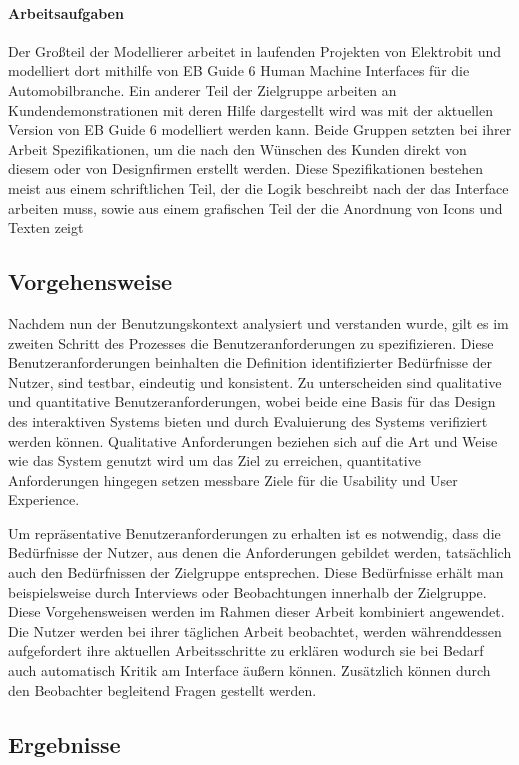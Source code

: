 \paragraph{Arbeitsaufgaben}
Der Großteil der Modellierer arbeitet in laufenden Projekten von Elektrobit und modelliert dort mithilfe von EB Guide 6 Human Machine Interfaces für die Automobilbranche.
Ein anderer Teil der Zielgruppe arbeiten an Kundendemonstrationen mit deren Hilfe dargestellt wird was mit der aktuellen Version von EB Guide 6 modelliert werden kann.
Beide Gruppen setzten bei ihrer Arbeit Spezifikationen, um die nach den Wünschen des Kunden direkt von diesem oder von Designfirmen erstellt werden.
Diese Spezifikationen bestehen meist aus einem schriftlichen Teil, der die Logik beschreibt nach der das Interface arbeiten muss, sowie aus einem grafischen Teil der die Anordnung von Icons und Texten zeigt

\subsection{Vorgehensweise}
Nachdem nun der Benutzungskontext analysiert und verstanden wurde, gilt es im zweiten Schritt des Prozesses die Benutzeranforderungen zu spezifizieren.
Diese Benutzeranforderungen beinhalten die Definition identifizierter Bedürfnisse der Nutzer, sind testbar, eindeutig und konsistent.
Zu unterscheiden sind qualitative und quantitative Benutzeranforderungen, wobei beide eine Basis für das Design des interaktiven Systems bieten und durch Evaluierung des Systems verifiziert werden können.
Qualitative Anforderungen beziehen sich auf die Art und Weise wie das System genutzt wird um das Ziel zu erreichen, quantitative Anforderungen hingegen setzen messbare Ziele für die Usability und User Experience.\cite{.f}

Um repräsentative Benutzeranforderungen zu erhalten ist es notwendig, dass die Bedürfnisse der Nutzer, aus denen die Anforderungen gebildet werden, tatsächlich auch den Bedürfnissen der Zielgruppe entsprechen.
Diese Bedürfnisse erhält man beispielsweise durch Interviews oder Beobachtungen innerhalb der Zielgruppe.
Diese Vorgehensweisen werden im Rahmen dieser Arbeit kombiniert angewendet.
Die Nutzer werden bei ihrer täglichen Arbeit beobachtet, werden währenddessen aufgefordert ihre aktuellen Arbeitsschritte zu erklären wodurch sie bei Bedarf auch automatisch Kritik am Interface äußern können.
Zusätzlich können durch den Beobachter begleitend Fragen gestellt werden.


\subsection{Ergebnisse}

